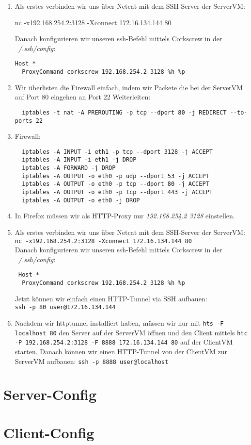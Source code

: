 \documentclass[a4paper,10pt]{scrartcl}
\begin{document}
\begin{enumerate}[\bfseries 1.]
	\item
        Als erstes verbinden wir uns über Netcat mit dem SSH-Server der ServerVM:
        \begin{usercommands}
nc -x192.168.254.2:3128 -Xconnect 172.16.134.144 80
        \end{usercommands}
		Danach konfigurieren wir unseren ssh-Befehl mittels Corkscrew in der
		\textit{~/.ssh/config}:\\
		\begin{lstlisting}
Host *
  ProxyCommand corkscrew 192.168.254.2 3128 %h %p
		\end{lstlisting}
		\item Wir überlisten die Firewall einfach, indem wir Packete die bei der
		      ServerVM auf Port 80 eingehen an Port 22 Weiterleiten:
		      \begin{lstlisting}
  iptables -t nat -A PREROUTING -p tcp --dport 80 -j REDIRECT --to-ports 22
		\end{lstlisting}
		\item Firewall:
		      \begin{lstlisting}
  iptables -A INPUT -i eth1 -p tcp --dport 3128 -j ACCEPT
  iptables -A INPUT -i eth1 -j DROP
  iptables -A FORWARD -j DROP
  iptables -A OUTPUT -o eth0 -p udp --dport 53 -j ACCEPT
  iptables -A OUTPUT -o eth0 -p tcp --dport 80 -j ACCEPT
  iptables -A OUTPUT -o eth0 -p tcp --dport 443 -j ACCEPT
  iptables -A OUTPUT -o eth0 -j DROP
		\end{lstlisting}
		\item In Firefox müssen wir als HTTP-Proxy nur \textit{192.168.254.2
			3128} einstellen.
			\item
			      Als erstes verbinden wir uns über Netcat mit dem SSH-Server der ServerVM:\\
			      \texttt{nc -x192.168.254.2:3128 -Xconnect 172.16.134.144 80}\\
			      Danach konfigurieren wir unseren ssh-Befehl mittels Corkscrew in der
			      \textit{~/.ssh/config}:\\
			      \begin{lstlisting}
 Host *
  ProxyCommand corkscrew 192.168.254.2 3128 %h %p
			\end{lstlisting}
			Jetzt können wir einfach einen HTTP-Tunnel via SSH aufbauen:\\
			\texttt{ssh -p 80 user@172.16.134.144}
			\item Nachdem wir httptunnel installiert haben, müssen wir nur mit
			      \texttt{hts -F localhost 80} den Server auf der ServerVM öffnen und
			      den Client mittels \texttt{htc -P 192.168.254.2:3128 -F 8888
			      172.16.134.144 80} auf der ClientVM starten. Danach können wir einen
			      HTTP-Tunnel von der ClientVM zur ServerVM aufbauen:
			      \texttt{ssh -p 8888 user@localhost}
		\end{enumerate}

\pagebreak

\begin{appendices}
    \section{Server-Config}
    
    \section{Client-Config}
    
\end{appendices}
\end{document}

